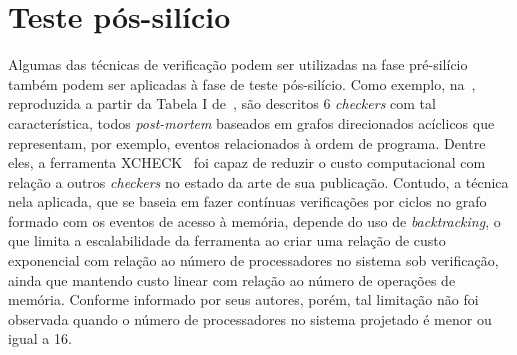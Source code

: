 \section{Teste pós-silício}

Algumas das técnicas de verificação podem ser utilizadas na fase pré-silício
também podem ser aplicadas à fase de teste pós-silício. Como exemplo,
na~, reproduzida a partir da Tabela I
de~\cite{Freitas:2013}, são descritos 6 \textit{checkers} com tal
característica, todos \textit{post-mortem} baseados em grafos direcionados
acíclicos que representam, por exemplo, eventos relacionados à ordem de
programa. Dentre eles, a ferramenta XCHECK~\cite{Hu:2012} foi capaz de reduzir
o custo computacional com relação a outros \textit{checkers} no estado da arte
de sua publicação. Contudo, a técnica nela aplicada, que se baseia em fazer
contínuas verificações por ciclos no grafo formado com os eventos de acesso à
memória, depende do uso de \textit{backtracking}, o que limita a escalabilidade
da ferramenta ao criar uma relação de custo exponencial com relação ao número
de processadores no sistema sob verificação, ainda que mantendo custo linear
com relação ao número de operações de memória. Conforme informado por seus
autores, porém, tal limitação não foi observada quando o número de
processadores no sistema projetado é menor ou igual a 16.


